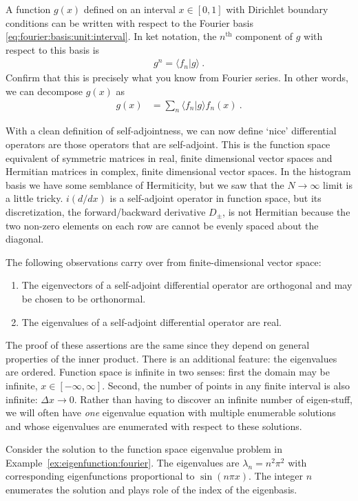 \documentclass[12pt, oneside]{report}    %
\begin{document}
\begin{exercise}\label{exe:eigenfunction:fourier}
A function $g(x)$ defined on an interval $x\in [0,1]$ with Dirichlet boundary conditions can be written with respect to the Fourier basis \eqref{eq:fourier:basis:unit:interval}. In ket notation, the $n^\text{th}$ component of $g$ with respect to this basis is
\begin{align}
  g^n = \langle f_n| g\rangle \ .
\end{align}
Confirm that this is precisely what you know from Fourier series. In other words, we can decompose $g(x)$ as
\begin{align}
  g(x) &= \sum_n \langle f_n| g\rangle f_n(x)  \ .
\end{align}
\end{exercise}







With a clean definition of self-adjointness, we can now define `nice' differential operators are those operators that are self-adjoint. This is the function space equivalent of symmetric matrices in real, finite dimensional vector spaces and Hermitian matrices in complex, finite dimensional vector spaces. In the histogram basis we have some semblance of Hermiticity, but we saw that the $N\to\infty$ limit is a little tricky. $i(d/dx)$ is a self-adjoint operator in function space, but its discretization, the forward/backward derivative $D_\pm$, is not Hermitian because the two non-zero elements on each row are cannot be evenly spaced about the diagonal. 

The following observations carry over from finite-dimensional vector space:
\begin{enumerate}
    \item The eigenvectors of a self-adjoint differential operator are orthogonal and may be chosen to be orthonormal.
    \item The eigenvalues of a self-adjoint differential operator are real.
\end{enumerate}
The proof of these assertions are the same since they depend on general properties of the inner product. There is an additional feature: the eigenvalues are ordered. Function space is infinite in two senses: first the domain may be infinite, $x\in [-\infty, \infty]$. Second, the number of points in any finite interval is also infinite: $\Delta x \to 0$. Rather than having to discover an infinite number of eigen-stuff, we will often have \emph{one} eigenvalue equation with multiple enumerable solutions and whose eigenvalues are enumerated with respect to these solutions. 
\begin{example}
Consider the solution to the function space eigenvalue problem in Example~\eqref{ex:eigenfunction:fourier}. The eigenvalues are $\lambda_n=n^2\pi^2$ with corresponding eigenfunctions proportional to $\sin(n\pi x)$. The integer $n$ enumerates the solution and plays role of the index of the eigenbasis.
\end{example}
\end{document}
